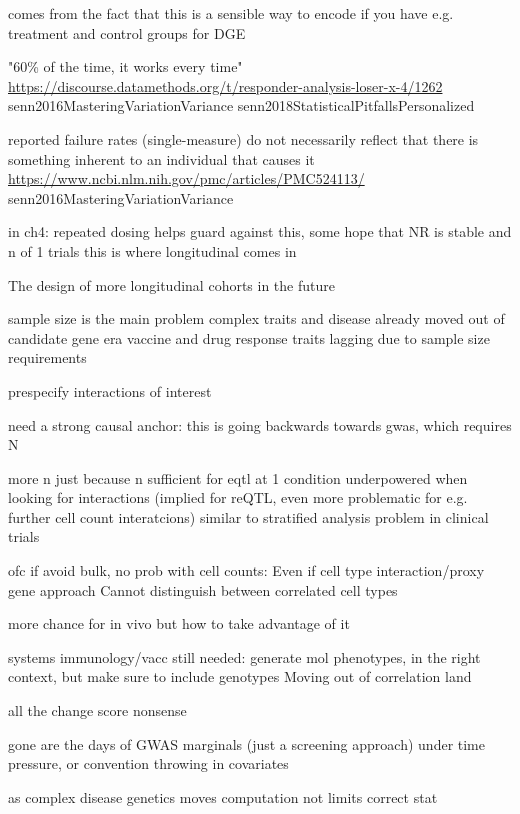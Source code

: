 \begin{outline}
            comes from the fact that this is a sensible way to encode if you have e.g. treatment and control groups for DGE

        "60\% of the time, it works every time"
            \url{https://discourse.datamethods.org/t/responder-analysis-loser-x-4/1262}
            senn2016MasteringVariationVariance
            senn2018StatisticalPitfallsPersonalized

            reported failure rates (single-measure) do not necessarily reflect that there is something inherent to an individual that causes it \url{https://www.ncbi.nlm.nih.gov/pmc/articles/PMC524113/} senn2016MasteringVariationVariance

                in ch4: repeated dosing helps guard against this, some hope that NR is stable
                and n of 1 trials
            this is where longitudinal comes in

The design of more longitudinal cohorts in the future

    sample size is the main problem
        complex traits and disease already moved out of candidate gene era
        vaccine and drug response traits lagging due to sample size requirements

        prespecify interactions of interest

    need a strong causal anchor: this is going backwards towards gwas, which requires N

    more n
        just because n sufficient for eqtl at 1 condition
        underpowered when looking for interactions (implied for reQTL, even more problematic for e.g. further cell count interatcions)
        similar to stratified analysis problem in clinical trials

    ofc if avoid bulk, no prob with cell counts:
        Even if cell type interaction/proxy gene approach
        Cannot distinguish between correlated cell types

    more chance for in vivo
        but how to take advantage of it

    systems immunology/vacc still needed: generate mol phenotypes, in the right context,
    but make sure to include genotypes
    Moving out of correlation land

    all the change score nonsense

    gone are the days of GWAS marginals (just a screening approach)
        under time pressure, or convention
        throwing in covariates

    as     complex disease genetics moves 
    computation not limits correct stat


\end{outline}
